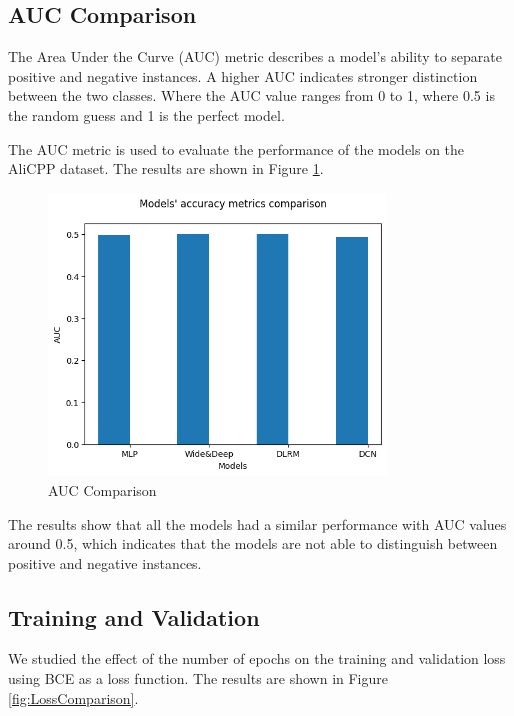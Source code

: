 \subsection{AUC Comparison}

The Area Under the Curve (AUC) metric describes a model's ability to separate positive and negative instances. A higher AUC indicates stronger distinction between the two classes. Where the AUC value ranges from 0 to 1, where 0.5 is the random guess and 1 is the perfect model.

The AUC metric is used to evaluate the performance of the models on the AliCPP dataset. The results are shown in Figure \ref{fig:AUCComparison}.

\begin{figure}[H]
    \centering
    \includegraphics[width=0.8\textwidth]{assets/models_comparasion.png}
    \caption[AUC Comparison]{AUC Comparison}
    \label{fig:AUCComparison}
\end{figure}

The results show that all the models had a similar performance with AUC values around 0.5, which indicates that the models are not able to distinguish between positive and negative instances.

\subsection{Training and Validation}
We studied the effect of the number of epochs on the training and validation loss using BCE as a loss function. The results are shown in Figure \ref{fig:LossComparison}.

